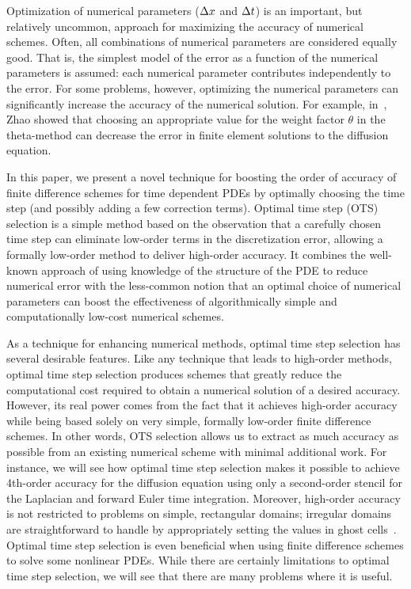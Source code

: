 \documentclass[fleqn,12pt,twoside]{article}
\begin{document}
Optimization of numerical parameters (\eg $\Delta x$ and $\Delta t$) is an important, 
but relatively uncommon, approach for maximizing the accuracy of numerical 
schemes.  Often, all combinations of numerical parameters are considered 
equally good.  That is, the simplest model of the error as a function 
of the numerical parameters is assumed:  each numerical parameter contributes
independently to the error.  For some problems, however, optimizing the 
numerical parameters can significantly increase the accuracy of the 
numerical solution.  For example, in~\cite{zhao_2006}, Zhao showed that 
choosing an appropriate value for the weight factor $\theta$ in the 
theta-method can decrease the error in finite element solutions to the 
diffusion equation. 

In this paper, we present a novel technique for boosting the order of 
accuracy of finite difference schemes for time dependent PDEs by optimally 
choosing the time step (and possibly adding a few correction terms).  
Optimal time step (OTS) selection is a simple method based on the observation 
that a carefully chosen time step can eliminate low-order terms in the 
discretization error, allowing a formally low-order method to deliver 
high-order accuracy.  It combines the well-known approach of using knowledge 
of the structure of the PDE to reduce numerical error with the less-common 
notion that an optimal choice of numerical parameters can boost the 
effectiveness of algorithmically simple and computationally low-cost numerical 
schemes.  

As a technique for enhancing numerical methods, optimal time step selection 
has several desirable features.  Like any technique that leads to high-order 
methods, optimal time step selection produces schemes that greatly reduce the 
computational cost required to obtain a numerical solution of a desired 
accuracy.  However, its real power comes from the fact that it achieves
high-order accuracy while being based solely on very simple, formally 
low-order finite difference schemes.  In other words, OTS selection allows us
to extract as much accuracy as possible from an existing numerical scheme
with minimal additional work.  For instance, we will see how optimal time step 
selection makes it possible to achieve 4th-order accuracy for the diffusion 
equation using only a second-order stencil for the Laplacian and forward 
Euler time integration.  Moreover, high-order accuracy is not restricted to 
problems on simple, rectangular domains; irregular domains are straightforward 
to handle by appropriately setting the values in ghost 
cells~\cite{gibou_2005,ito_2005,fedkiw_1999,osher_fedkiw_book}.  
Optimal time step selection is even beneficial when 
using finite difference schemes to solve some nonlinear PDEs.  While there 
are certainly limitations to optimal time step selection, we will see that 
there are many problems where it is useful.  
\end{document}
